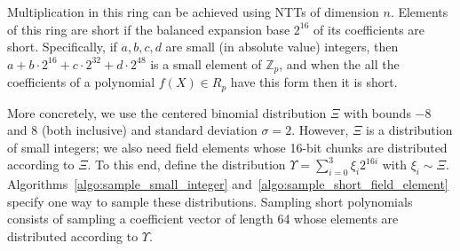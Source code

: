 Multiplication in this ring can be achieved using NTTs of dimension $n$. Elements of this ring are short if the balanced expansion base $2^{16}$ of its coefficients are short. Specifically, if $a, b, c, d$ are small  (in absolute value) integers, then $a + b \cdot 2^{16} + c \cdot 2^{32} + d \cdot 2^{48}$ is a small element of $\mathbb{Z}_p$, and when the all the coefficients of a polynomial $f(X) \in R_p$ have this form then it is short.

More concretely, we use the centered binomial distribution $\Xi$ with bounds $-8$ and $8$ (both inclusive) and standard deviation $\sigma = 2$. However, $\Xi$ is a distribution of small integers; we also need field elements whose 16-bit chunks are distributed according to $\Xi$. To this end, define the distribution $\Upsilon = \sum_{i=0}^{3} \xi_i 2^{16i}$ with $\xi_i \sim \Xi$. Algorithms~\ref{algo:sample_small_integer} and~\ref{algo:sample_short_field_element} specify one way to sample these distributions. Sampling short polynomials consists of sampling a coefficient vector of length 64 whose elements are distributed according to $\Upsilon$.


\begin{algorithm}[!t] \label{algo:sample_small_integer}
\begin{scriptsize}
\caption{\emph{$\mathsf{sample\_small\_integer}$}}
\KwIn{}
\end{scriptsize}
\end{algorithm} 

\begin{algorithm}[!t] \label{algo:sample_short_field_element}
\begin{scriptsize}
\caption{\emph{$\mathsf{sample\_short\_field\_element}$}}
\KwIn{}
\end{scriptsize}
\end{algorithm} 

